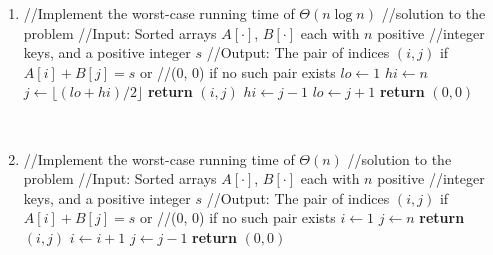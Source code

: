 \documentclass[11pt]{article}
\begin{document}
\begin{enumerate}
\item
    \begin{algorithmic}[1]
        \State //Implement the worst-case running time of $\Theta(n \log n)$
        \State //solution to the problem
        \State //Input: Sorted arrays $A[\cdot]$, $B[\cdot]$ each with $n$ positive
        \State //integer keys, and a positive integer $s$
        \State //Output: The pair of indices $(i, j)$ if $A[i]+B[j]=s$ or
        \State //(0, 0) if no such pair exists
             
                \State $lo\gets 1$
                \State $hi\gets n$
                    \State $j\gets \lfloor(lo+hi)/2\rfloor$  
                        \State \textbf{return} $(i, j)$
                    \EndIf
                        \State $hi\gets j-1$
                    \Else
                        \State $lo\gets j+1$
                    \EndIf
                \EndWhile
                \EndFor
        \State \textbf{return} $(0, 0)$
        \EndFunction
\end{algorithmic}
~
\item
\begin{algorithmic}[1]
    \State //Implement the worst-case running time of $\Theta(n)$
    \State //solution to the problem
    \State //Input: Sorted arrays $A[\cdot]$, $B[\cdot]$ each with $n$ positive
    \State //integer keys, and a positive integer $s$
    \State //Output: The pair of indices $(i, j)$ if $A[i]+B[j]=s$ or
    \State //(0, 0) if no such pair exists
        \State $i\gets 1$
        \State $j\gets n$
         
            \State \textbf{return} $(i, j)$
            \EndIf
                \State $i\gets i+1$ 
            \Else
                \State $j\gets j-1$ 
            \EndIf
        \EndWhile
    \State \textbf{return} $(0, 0)$
    \EndFunction
\end{algorithmic}
\end{enumerate}
\end{document}
